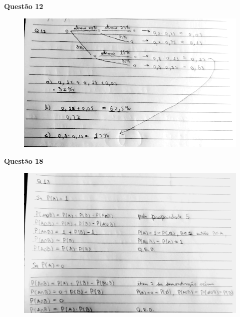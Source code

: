 \documentclass[12pt]{article}   %
\begin{document}
\par \textbf{Questão 12}
	\begin{figure}[h!]
		\includegraphics[scale=0.9]{q12}
	\end{figure}
\vspace{+12pt}

\par \textbf{Questão 18}
	\begin{figure}[h!]
		\includegraphics[scale=0.6]{q18}
	\end{figure} 	
\vspace{+12pt}
\end{document}
